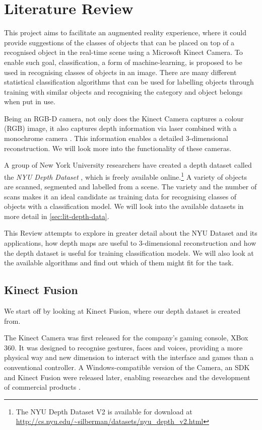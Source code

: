\chapter{Literature Review} \label{chap:lit-review}
This project aims to facilitate an augmented reality experience, where it could provide suggestions of the classes of objects that can be placed on top of a recognised object in the real-time scene using a Microsoft Kinect Camera. To enable such goal, classification, a form of machine-learning, is proposed to be used in recognising classes of objects in an image. There are many different statistical classification algorithms that can be used for labelling objects through training with similar objects and recognising the category and object belongs when put in use. 

Being an RGB-D camera, not only does the Kinect Camera captures a colour (RGB) image, it also captures depth information via laser combined with a monochrome camera \cite{kinect-doc}. This information enables a detailed 3-dimensional reconstruction. We will look more into the functionality of these cameras.

A group of New York University researchers have created a depth dataset called the \textit{NYU Depth Dataset} \cite{nyu-dataset}, which is freely available online.\footnote{The NYU Depth Dataset V2 is available for download at \url{http://cs.nyu.edu/~silberman/datasets/nyu_depth_v2.html}} A variety of objects are scanned, segmented and labelled from a scene. The variety and the number of scans makes it an ideal candidate as training data for recognising classes of objects with a classification model. We will look into the available datasets in more detail in \autoref{sec:lit-depth-data}.

This Review attempts to explore in greater detail about the NYU Dataset and its applications, how depth maps are useful to 3-dimensional reconstruction and how the depth dataset is useful for training classification models. We will also look at the available algorithms and find out which of them might fit for the task.

\newpage

\section{Kinect Fusion}
We start off by looking at Kinect Fusion, where our depth dataset is created from. 

The Kinect Camera was first released for the company's gaming console, XBox 360. It was designed to recognise gestures, faces and voices, providing a more physical way and new dimension to interact with the interface and games than a conventional controller. A Windows-compatible version of the Camera, an SDK and Kinect Fusion were released later, enabling researches and the development of commercial products \cite{kinect-doc}. 

